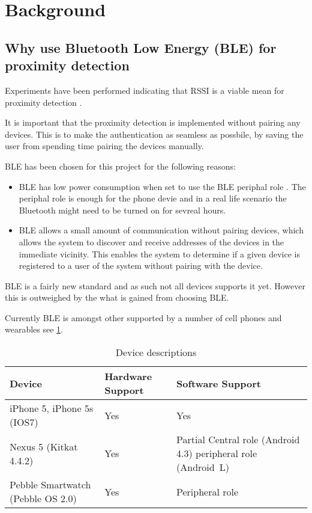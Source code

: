 \section{Background}

\subsection{Why use Bluetooth Low Energy (BLE) for proximity detection}

Experiments have been performed indicating that RSSI is a viable mean for proximity detection \cite{ref:Takashi}. 

It is important that the proximity detection is implemented without pairing any devices. This is to make the authentication as seamless as possbile, by saving the user from spending time pairing the devices manually.

BLE has been chosen for this project for the following reasons:
\begin{itemize}
	\item BLE has low power consumption when set to use the BLE periphal role \cite{ref:Power_usage}. The periphal role is enough for the phone devie and in a real life scenario the Bluetooth might need to be turned on for sevreal hours.
	\item BLE allows a small amount of communication without pairing devices, which allows the system to discover and receive addresses of the devices in the immediate vicinity. This enables the system to determine if a given device is registered to a user of the system without pairing with the device.
\end{itemize}

BLE is a fairly new standard and as such not all devices supports it yet. However this is outweighed by the what is gained from choosing BLE. 

Currently BLE is amongst other supported by a number of cell phones and wearables see \cref{table:devices}.

\begin{table}[!t]
\caption{Device descriptions}
\label{table:devices}
\centering
\begin{tabular}{|p{2.3cm}|p{1.3cm}|p{3.9cm}|}
\hline
\textbf{Device} & \textbf{Hardware Support} & \textbf{Software Support}\\
\hline
iPhone 5, iPhone 5s (IOS7) & Yes & Yes\\
\hline
Nexus 5 \newline (Kitkat 4.4.2) & Yes & Partial \newline
Central role (Android 4.3)  \newline
peripheral role (Android~L)\\
\hline
Pebble Smartwatch (Pebble OS 2.0) & Yes & Peripheral role\\
\hline
\end{tabular}
\end{table}

